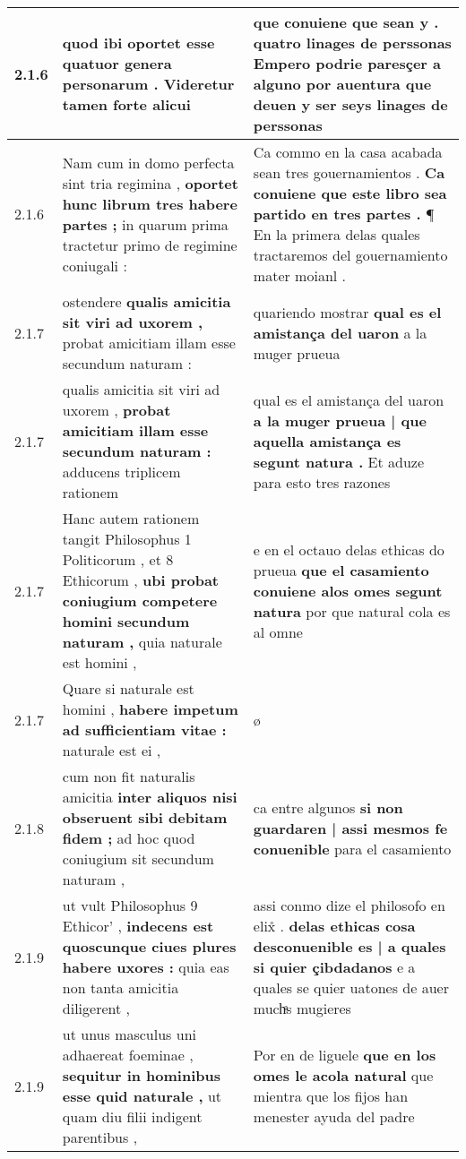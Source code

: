 \begin{tabular}{|p{1cm}|p{6.5cm}|p{6.5cm}|}
2.1.6 & quod ibi oportet \textbf{ esse quatuor genera personarum . } Videretur tamen forte alicui & que conuiene que sean y . \textbf{ quatro linages de perssonas } Empero podrie paresçer a alguno por auentura que deuen y ser seys linages de perssonas \\\hline
2.1.6 & Nam cum in domo perfecta sint tria regimina , \textbf{ oportet hunc librum tres habere partes ; } in quarum prima tractetur primo de regimine coniugali : & Ca commo en la casa acabada sean tres gouernamientos . \textbf{ Ca conuiene que este libro sea partido en tres partes . } ¶ En la primera delas quales tractaremos del gouernamiento mater moianl . \\\hline
2.1.7 & ostendere \textbf{ qualis amicitia sit viri ad uxorem , } probat amicitiam illam esse secundum naturam : & quariendo mostrar \textbf{ qual es el amistança del uaron } a la muger prueua \\\hline
2.1.7 & qualis amicitia sit viri ad uxorem , \textbf{ probat amicitiam illam esse secundum naturam : } adducens triplicem rationem & qual es el amistança del uaron \textbf{ a la muger prueua | que aquella amistança es segunt natura . } Et aduze para esto tres razones \\\hline
2.1.7 & Hanc autem rationem tangit Philosophus 1 Politicorum , et 8 Ethicorum , \textbf{ ubi probat coniugium competere homini secundum naturam , } quia naturale est homini , & e en el octauo delas ethicas do prueua \textbf{ que el casamiento conuiene alos omes segunt natura } por que natural cola es al omne \\\hline
2.1.7 & Quare si naturale est homini , \textbf{ habere impetum ad sufficientiam vitae : } naturale est ei , & ø \\\hline
2.1.8 & cum non fit naturalis amicitia \textbf{ inter aliquos nisi obseruent sibi debitam fidem ; } ad hoc quod coniugium sit secundum naturam , & ca entre algunos \textbf{ si non guardaren | assi mesmos fe conuenible } para el casamiento \\\hline
2.1.9 & ut vult Philosophus 9 Ethicor’ , \textbf{ indecens est quoscunque ciues plures habere uxores : } quia eas non tanta amicitia diligerent , & assi conmo dize el philosofo en elix̊ . \textbf{ delas ethicas cosa desconuenible es | a quales si quier çibdadanos } e a quales se quier uatones de auer muchͣs mugieres \\\hline
2.1.9 & ut unus masculus uni adhaereat foeminae , \textbf{ sequitur in hominibus esse quid naturale , } ut quam diu filii indigent parentibus , & Por en de liguele \textbf{ que en los omes le acola natural } que mientra que los fijos han menester ayuda del padre \\\hline

\end{tabular}
